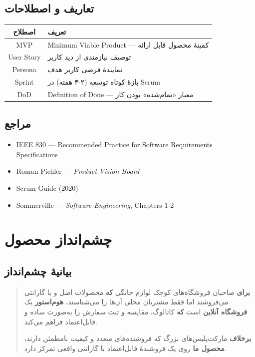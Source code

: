 \documentclass[12pt, a4paper]{article}
\begin{document}
\subsection{تعاریف و اصطلاحات}
\begin{center}
\begin{tabular}{|c|p{9cm}|}
\hline
\textbf{اصطلاح} & \textbf{تعریف} \\
\hline
MVP & Minimum Viable Product — کمینهٔ محصول قابل ارائه \\
\hline
User Story & توصیف نیازمندی از دید کاربر \\
\hline
Persona & نمایندهٔ فرضی کاربر هدف \\
\hline
Sprint & بازهٔ کوتاه توسعه (۲-۳ هفته) در Scrum \\
\hline
DoD & Definition of Done — معیار «تمام‌شده» بودن کار \\
\hline
\end{tabular}
\end{center}

\subsection{مراجع}
\begin{itemize}
    \item IEEE 830 — Recommended Practice for Software Requirements Specifications
    \item Roman Pichler — \textit{Product Vision Board}
    \item Scrum Guide (2020)
    \item Sommerville — \textit{Software Engineering}, Chapters 1-2
\end{itemize}

\section{چشم‌انداز محصول}

\subsection{بیانیهٔ چشم‌انداز}

\begin{quote}
\textbf{برای} صاحبان فروشگاه‌های کوچک لوازم خانگی \textbf{که} محصولات اصل و
با گارانتی می‌فروشند اما فقط مشتریان محلی آن‌ها را می‌شناسند،
\textbf{هوم‌استور} یک \textbf{فروشگاه آنلاین} است
\textbf{که} کاتالوگ، مقایسه و ثبت سفارش را به‌صورت ساده و قابل‌اعتماد فراهم می‌کند.

\textbf{برخلاف} مارکت‌پلیس‌های بزرگ که فروشنده‌های متعدد و کیفیت نامطمئن دارند،
\textbf{محصول ما} روی یک فروشندهٔ قابل‌اعتماد با گارانتی واقعی تمرکز دارد.
\end{quote}
\end{document}
